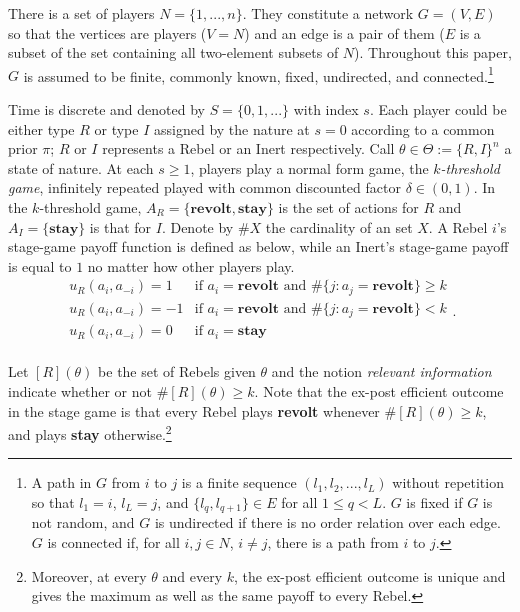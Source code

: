 \documentclass[12pt,letter]{article}
\theoremstyle{definition}
\theoremstyle{remark}
\theoremstyle{claim}
\begin{document}
There is a set of players $N=\{1,...,n\}$. They constitute a network $G=(V,E)$ so that the vertices are players ($V=N$) and an edge is a pair of them ($E$ is a subset of the set containing all two-element subsets of $N$). Throughout this paper, $G$ is assumed to be finite, commonly known, fixed, undirected, and connected.\footnote{A path in $G$ from $i$ to $j$ is a finite sequence $(l_1,l_2,...,l_L)$ without repetition so that $l_1=i$, $l_L=j$, and $\{l_q,l_{q+1}\}\in E$ for all $1\leq q<L$. $G$ is fixed if $G$ is not random, and $G$ is undirected if there is no order relation over each edge. $G$ is connected if, for all $i,j\in N$, $i\neq j$, there is a path from $i$ to $j$.}

Time is discrete and denoted by $S=\{0,1,...\}$ with index $s$. Each player could be either type $R$ or type $I$ assigned by the nature at $s=0$ according to a common prior $\pi$; $R$ or $I$ represents a Rebel or an Inert respectively. Call $\theta\in \Theta:= \{R,I\}^n$ a state of nature. At each $s\geq 1$, players play a normal form game, the \textit{$k$-threshold game}, infinitely repeated played with common discounted factor $\delta\in (0,1)$. In the $k$-threshold game, $A_R=\{\textbf{revolt}, \textbf{stay}\}$ is the set of actions for $R$ and $A_I=\{\textbf{stay}\}$ is that for $I$. Denote by $\#X$ the cardinality of an set $X$. A Rebel $i$'s stage-game payoff function is defined as below, while an Inert's stage-game payoff is equal to $1$ no matter how other players play. 
\[   
\begin{array}{ll}
      u_{R}(a_{i},a_{-i})=1 & \text{if $a_{i}=\textbf{revolt}$ and $\#\{j:a_{j}=\textbf{revolt}\}\geq k$} \\
      u_{R}(a_{i},a_{-i})=-1 & \text{if $a_{i}=\textbf{revolt}$ and $\#\{j:a_{j}=\textbf{revolt}\}< k$} \\
      u_{R}(a_{i},a_{-i})=0 & \text{if $a_{i}=\textbf{stay}$} \\
\end{array} 
. \]



Let $[R](\theta)$ be the set of Rebels given $\theta$ and the notion \textit{relevant information} indicate whether or not $\#[R](\theta)\geq k$. Note that the ex-post efficient outcome in the stage game is that every Rebel plays \textbf{revolt} whenever $\#[R](\theta)\geq k$, and plays \textbf{stay} otherwise.\footnote{Moreover, at every $\theta$ and every $k$, the ex-post efficient outcome is unique and gives the maximum as well as the same payoff to every Rebel.} 
\end{document}
